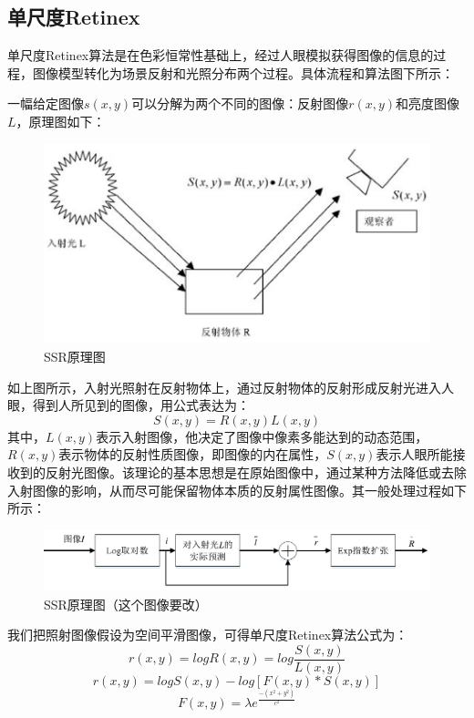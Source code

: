 \documentclass[12pt]{book}
\begin{document}
				\subsection{单尺度Retinex}单尺度Retinex算法是在色彩恒常性基础上，经过人眼模拟获得图像的信息的过程，图像模型转化为场景反射和光照分布两个过程。具体流程和算法图下所示：

一幅给定图像$s(x,y)$可以分解为两个不同的图像：反射图像$r(x,y)$和亮度图像$L$，原理图如下：
			\begin{figure}[!ht]\centering
				\includegraphics[totalheight=60mm]{./figures/retinexSSR.png}
				\caption{SSR原理图\label{SSR}}
			\end{figure}

如上图所示，入射光照射在反射物体上，通过反射物体的反射形成反射光进入人眼，得到人所见到的图像，用公式表达为：
\begin{equation}     S(x,y)=R(x,y)L(x,y)    \end{equation}	
其中，$L(x,y)$表示入射图像，他决定了图像中像素多能达到的动态范围，$R(x,y)$表示物体的反射性质图像，即图像的内在属性，$S(x,y)$表示人眼所能接收到的反射光图像。该理论的基本思想是在原始图像中，通过某种方法降低或去除入射图像的影响，从而尽可能保留物体本质的反射属性图像。其一般处理过程如下所示：
			\begin{figure}[!ht]\centering
				\includegraphics[totalheight=30mm,width=160mm]{./figures/retinexSSR1.png}
				\caption{SSR原理图（这个图像要改）\label{SSR}}
			\end{figure}

我们把照射图像假设为空间平滑图像，可得单尺度Retinex算法公式为：
\begin{equation}     r(x,y)=logR(x,y)=log \frac{S(x,y)}{L(x,y)}    \end{equation}
\begin{equation}     r(x,y)=logS(x,y)-log \left[ F(x,y)*S(x,y) \right]    \end{equation}	
\begin{equation}     F(x,y)=\lambda e^{\frac{-(x^2+y^2)}{c^2}}    \end{equation}	
\end{document}
